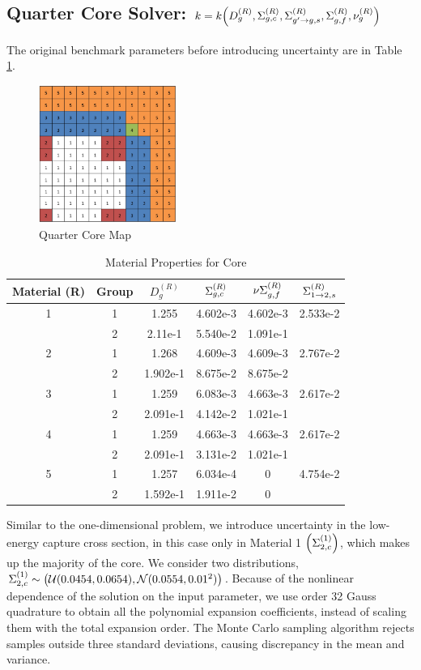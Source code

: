 \subsection{Quarter Core Solver: $k=k\qty(D_g^{(R)},\Sigma_{g,c}^{(R)},\Sigma_{g'\to g,s}^{(R)},\Sigma_{g,f}^{(R)},\nu_g^{(R)})$}
The original benchmark parameters before introducing uncertainty are in Table \ref{tab:coremats}.
\begin{figure}[H]
\centering
   \includegraphics[width=0.4\textwidth]{../graphics/core}
   \caption{Quarter Core Map}
\end{figure}
\begin{table}[H]
\centering
\begin{tabular}{c c | c c c c}
Material (R)& Group & $D_g^{(R)}$ & $\Sigma_{g,c}^{(R)}$ & $\nu\Sigma_{g,f}^{(R)}$ & $\Sigma_{1\to2,s}^{(R)}$ \\ \hline
1 & 1 & 1.255    & 4.602e-3 & 4.602e-3 & 2.533e-2 \\
  & 2 & 2.11e-1  & 5.540e-2 & 1.091e-1 & \\ \hline
2 & 1 & 1.268    & 4.609e-3 & 4.609e-3 & 2.767e-2 \\
  & 2 & 1.902e-1 & 8.675e-2 & 8.675e-2 & \\ \hline
3 & 1 & 1.259    & 6.083e-3 & 4.663e-3 & 2.617e-2 \\
  & 2 & 2.091e-1 & 4.142e-2 & 1.021e-1 & \\ \hline
4 & 1 & 1.259    & 4.663e-3 & 4.663e-3 & 2.617e-2 \\
  & 2 & 2.091e-1 & 3.131e-2 & 1.021e-1 & \\ \hline
5 & 1 & 1.257    & 6.034e-4  & 0 & 4.754e-2 \\
  & 2 & 1.592e-1 & 1.911e-2  & 0 & 
\end{tabular}
\caption{Material Properties for Core}
\label{tab:coremats}
\end{table}
Similar to the one-dimensional problem, we introduce uncertainty in the low-energy capture cross section, in this case only in Material 1 $\qty(\Sigma_{2,c}^{(1)})$, which makes up the majority of the core.  We consider two distributions, $\Sigma_{2,c}^{(1)}\sim\qty(\mathcal{U}(0.0454,0.0654),\mathcal{N}(0.0554,0.01^2))$.  Because of the nonlinear dependence of the solution on the input parameter, we use order 32 Gauss quadrature to obtain all the polynomial expansion coefficients, instead of scaling them with the total expansion order.  The Monte Carlo sampling algorithm rejects samples outside three standard deviations, causing discrepancy in the mean and variance.
